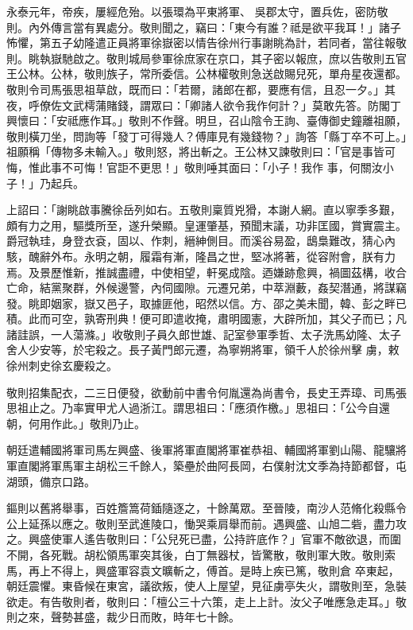 \begin{pinyinscope}
 永泰元年，帝疾，屢經危殆。以張環為平東將軍、
 吳郡太守，置兵佐，密防敬則。內外傳言當有異處分。敬則聞之，竊曰：「東今有誰？祗是欲平我耳！」諸子怖懼，第五子幼隆遣正員將軍徐嶽密以情告徐州行事謝眺為計，若同者，當往報敬則。眺執嶽馳啟之。敬則城局參軍徐庶家在京口，其子密以報庶，庶以告敬則五官王公林。公林，敬則族子，常所委信。公林權敬則急送啟賜兒死，單舟星夜還都。敬則令司馬張思祖草啟，既而曰：「若爾，諸郎在都，要應有信，且忍一夕。」其夜，呼僚佐文武樗蒲賭錢，謂眾曰：「卿諸人欲令我作何計？」莫敢先答。防閣丁興懷曰：「安祗應作耳。」敬則不作聲。明旦，召山陰令王詢、臺傳御史鐘離祖願，敬則橫刀坐，問詢等「發丁可得幾人？傅庫見有幾錢物？」詢答「縣丁卒不可上。」祖願稱「傳物多未輸入。」敬則怒，將出斬之。王公林又諫敬則曰：「官是事皆可悔，惟此事不可悔！官詎不更思！」敬則唾其面曰：「小子！我作
 事，何關汝小子！」乃起兵。



 上詔曰：「謝眺啟事騰徐岳列如右。五敬則稟質兇猾，本謝人網。直以寧季多艱，頗有力之用，驅獎所至，遂升榮顯。皇運肇基，預聞末議，功非匡國，賞實震主。爵冠執珪，身登衣袞，固以、作刺，縉紳側目。而溪谷易盈，鴟梟難改，猜心內駭，醜辭外布。永明之朝，履霜有漸，隆昌之世，堅冰將著，從容附會，朕有力焉。及景歷惟新，推誠盡禮，中使相望，軒冕成陰。迺嫌跡愈興，禍圖茲構，收合亡命，結黨聚群，外候邊警，內伺國隙。元遷兄弟，中萃淵藪，姦契潛通，將謀竊發。眺即姻家，嶽又邑子，取據匪他，昭然以信。方、邵之美未聞，韓、彭之畔已積。此而可空，孰寄刑典！便可即遣收掩，肅明國憲，大辟所加，其父子而已；凡諸詿誤，一人蕩滌。」收敬則子員久郎世雄、記室參軍季哲、太子洗馬幼隆、太子舍人少安等，於宅殺之。長子黃門郎元遷，為寧朔將軍，領千人於徐州擊
 虜，敕徐州刺史徐玄慶殺之。



 敬則招集配衣，二三日便發，欲動前中書令何胤還為尚書令，長史王弄璋、司馬張思祖止之。乃率實甲尤人過浙江。謂思祖曰：「應須作檄。」思祖曰：「公今自還朝，何用作此。」敬則乃止。



 朝廷遣輔國將軍司馬左興盛、後軍將軍直閣將軍崔恭祖、輔國將軍劉山陽、龍驤將軍直閣將軍馬軍主胡松三千餘人，築壘於曲阿長岡，右僕射沈文季為持節都督，屯湖頭，備京口路。



 鏂則以舊將舉事，百姓簷篙荷鍤隨逐之，十餘萬眾。至晉陵，南沙人范脩化殺縣令公上延孫以應之。敬則至武進陵口，慟哭乘肩舉而前。遇興盛、山旭二砦，盡力攻之。興盛使軍人遙告敬則曰：「公兒死已盡，公持許底作？」官軍不敵欲退，而圍不開，各死戰。胡松領馬軍突其後，白丁無器杖，皆驚散，敬則軍大敗。敬則索馬，再上不得上，興盛軍容袁文曠斬之，傅首。是時上疾已篤，敬則倉
 卒東起，朝廷震懼。東昏候在東宮，議欲叛，使人上屋望，見征虜亭失火，謂敬則至，急裝欲走。有告敬則者，敬則曰：「檀公三十六策，走上上計。汝父子唯應急走耳。」敬則之來，聲勢甚盛，裁少日而敗，時年七十餘。




\end{pinyinscope}
